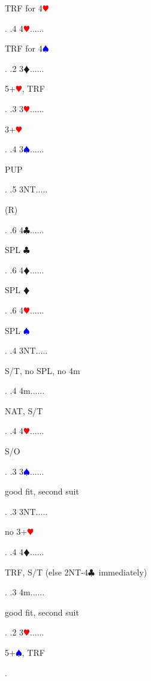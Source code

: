 \documentclass[a4paper]{article}
\newcommand{\BC}{\textcolor{OliveGreen}{$\clubsuit$}}
\newcommand{\BD}{\textcolor{RedOrange}{$\vardiamondsuit$}}
\newcommand{\BH}{\textcolor{Red}{$\varheartsuit${}}}
\newcommand{\BS}{\textcolor{Blue}{$\spadesuit${}}}
\begin{document}
{\begin{minipage}[t]{0.8\textwidth}
TRF for 4\BH 
\end{minipage}. 
 .4 4\BH......\begin{minipage}[t]{0.8\textwidth}
TRF for 4\BS 
\end{minipage}. 
 .2 3\BD......\begin{minipage}[t]{0.8\textwidth}
5+\BH , TRF
\end{minipage}. 
 .3 3\BH......\begin{minipage}[t]{0.8\textwidth}
3+\BH 
\end{minipage}. 
 .4 3\BS......\begin{minipage}[t]{0.8\textwidth}
PUP
\end{minipage}. 
 .5 3NT.....\begin{minipage}[t]{0.8\textwidth}
(R)
\end{minipage}. 
 .6 4\BC......\begin{minipage}[t]{0.8\textwidth}
SPL \BC 
\end{minipage}. 
 .6 4\BD......\begin{minipage}[t]{0.8\textwidth}
SPL \BD 
\end{minipage}. 
 .6 4\BH......\begin{minipage}[t]{0.8\textwidth}
SPL \BS 
\end{minipage}. 
 .4 3NT.....\begin{minipage}[t]{0.8\textwidth}
S/T, no SPL, no 4m
\end{minipage}. 
 .4 4m......\begin{minipage}[t]{0.8\textwidth}
NAT, S/T
\end{minipage}. 
 .4 4\BH......\begin{minipage}[t]{0.8\textwidth}
S/O
\end{minipage}. 
 .3 3\BS......\begin{minipage}[t]{0.8\textwidth}
good fit, second suit
\end{minipage}. 
 .3 3NT.....\begin{minipage}[t]{0.8\textwidth}
no 3+\BH 
\end{minipage}. 
 .4 4\BD......\begin{minipage}[t]{0.8\textwidth}
TRF, S/T (else 2NT-4\BC\ immediately)
\end{minipage}. 
 .3 4m......\begin{minipage}[t]{0.8\textwidth}
good fit, second suit
\end{minipage}. 
 .2 3\BH......\begin{minipage}[t]{0.8\textwidth}
5+\BS , TRF
\end{minipage}. 
}
\end{document}
